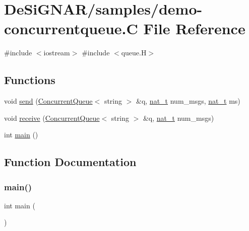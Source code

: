 \hypertarget{demo-concurrentqueue_8_c}{}\section{De\+Si\+G\+N\+A\+R/samples/demo-\/concurrentqueue.C File Reference}
\label{demo-concurrentqueue_8_c}
{\ttfamily \#include $<$iostream$>$}\newline
{\ttfamily \#include $<$queue.\+H$>$}\newline
\subsection*{Functions}
\begin{DoxyCompactItemize}
\item 
void \hyperlink{demo-concurrentqueue_8_c_aa97d75998c4e7c6e867a476cb2ac4fba}{send} (\hyperlink{class_designar_1_1_concurrent_queue}{Concurrent\+Queue}$<$ string $>$ \&q, \hyperlink{namespace_designar_aa72662848b9f4815e7bf31a7cf3e33d1}{nat\+\_\+t} num\+\_\+msgs, \hyperlink{namespace_designar_aa72662848b9f4815e7bf31a7cf3e33d1}{nat\+\_\+t} ms)
\item 
void \hyperlink{demo-concurrentqueue_8_c_ab141b5e3494a69e30757648ece395552}{receive} (\hyperlink{class_designar_1_1_concurrent_queue}{Concurrent\+Queue}$<$ string $>$ \&q, \hyperlink{namespace_designar_aa72662848b9f4815e7bf31a7cf3e33d1}{nat\+\_\+t} num\+\_\+msgs)
\item 
int \hyperlink{demo-concurrentqueue_8_c_ae66f6b31b5ad750f1fe042a706a4e3d4}{main} ()
\end{DoxyCompactItemize}


\subsection{Function Documentation}
\mbox{\label{demo-concurrentqueue_8_c_ae66f6b31b5ad750f1fe042a706a4e3d4}} 
\subsubsection{\texorpdfstring{main()}{main()}}
{\footnotesize\ttfamily int main (\begin{DoxyParamCaption}{ }\end{DoxyParamCaption})}



